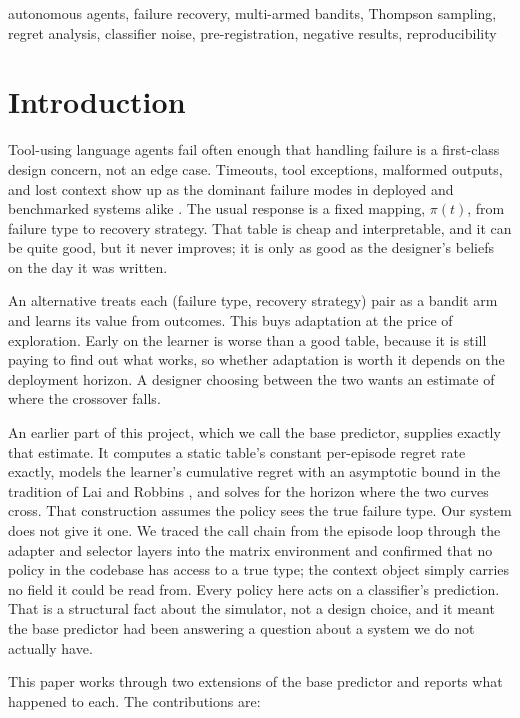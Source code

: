 \documentclass[conference]{IEEEtran}
\begin{document}
\begin{IEEEkeywords}
autonomous agents, failure recovery, multi-armed bandits, Thompson
sampling, regret analysis, classifier noise, pre-registration, negative
results, reproducibility
\end{IEEEkeywords}

\section{Introduction}

Tool-using language agents fail often enough that handling failure is a
first-class design concern, not an edge case. Timeouts, tool exceptions,
malformed outputs, and lost context show up as the dominant failure modes
in deployed and benchmarked systems alike \cite{cemri2025,zhu2025,vuddanti2025}.
The usual response is a fixed mapping, $\pi(t)$, from failure type to
recovery strategy. That table is cheap and interpretable, and it can be
quite good, but it never improves; it is only as good as the designer's
beliefs on the day it was written.

An alternative treats each (failure type, recovery strategy) pair as a
bandit arm and learns its value from outcomes. This buys adaptation at
the price of exploration. Early on the learner is worse than a good
table, because it is still paying to find out what works, so whether
adaptation is worth it depends on the deployment horizon. A designer
choosing between the two wants an estimate of where the crossover falls.

An earlier part of this project, which we call the base predictor,
supplies exactly that estimate. It computes a static table's constant
per-episode regret rate exactly, models the learner's cumulative regret
with an asymptotic bound in the tradition of Lai and Robbins
\cite{lai1985}, and solves for the horizon where the two curves cross.
That construction assumes the policy sees the true failure type. Our
system does not give it one. We traced the call chain from the episode
loop through the adapter and selector layers into the matrix environment
and confirmed that no policy in the codebase has access to a true type;
the context object simply carries no field it could be read from. Every
policy here acts on a classifier's prediction. That is a structural fact
about the simulator, not a design choice, and it meant the base predictor
had been answering a question about a system we do not actually have.

This paper works through two extensions of the base predictor and
reports what happened to each. The contributions are:
\end{document}
